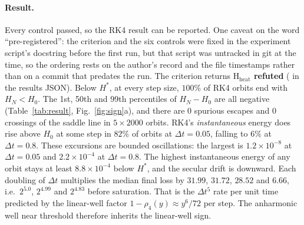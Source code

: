 \documentclass[11pt,a4paper]{article}
\theoremstyle{definition}
\newcommand{\Hs}{H^{*}}
\begin{document}
\paragraph{Result.}
Every control passed, so the RK4 result can be reported. One caveat on the word ``pre-registered'': the criterion and the six controls were fixed in the experiment script's docstring before the first run, but that script was untracked in git at the time, so the ordering rests on the author's record and the file timestamps rather than on a commit that predates the run. The criterion returns \textbf{$\mathrm{H_{heat}}$ refuted} ( in the results JSON). Below $\Hs$, at every step size, $100\%$ of RK4 orbits end with $H_N<H_0$. The 1st, 50th and 99th percentiles of $H_N-H_0$ are all negative (Table~\ref{tab:result}, Fig.~\ref{fig:sign}a), and there are $0$ spurious escapes and $0$ crossings of the saddle line in $5\times2000$ orbits. RK4's \emph{instantaneous} energy does rise above $H_0$ at some step in $82\%$ of orbits at $\Delta t=0.05$, falling to $6\%$ at $\Delta t=0.8$. These excursions are bounded oscillations: the largest is $1.2\times10^{-8}$ at $\Delta t=0.05$ and $2.2\times10^{-4}$ at $\Delta t=0.8$. The highest instantaneous energy of any orbit stays at least $8.8\times10^{-4}$ below $\Hs$, and the secular drift is downward. Each doubling of $\Delta t$ multiplies the median final loss by $31.99$, $31.72$, $28.52$ and $6.66$, i.e.\ $2^{5.0}$, $2^{4.99}$ and $2^{4.83}$ before saturation. That is the $\Delta t^5$ rate per unit time predicted by the linear-well factor $1-\rho_4(y)\approx y^6/72$ per step. The anharmonic well near threshold therefore inherits the linear-well sign.
\end{document}
